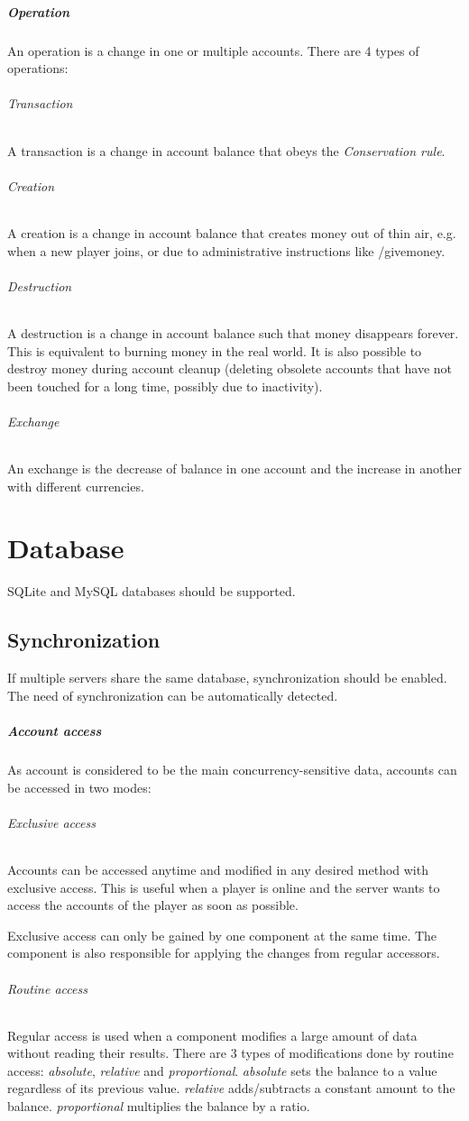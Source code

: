 \documentclass{report}
\begin{document}
			\paragraph{Operation}
				An operation is a change in one or multiple accounts. There are 4 types of operations:
				\subparagraph{Transaction} A transaction is a change in account balance that obeys the \textit{Conservation rule}.
				\subparagraph{Creation} A creation is a change in account balance that creates money out of thin air, e.g. when a new player joins, or due to administrative instructions like /givemoney.
				\subparagraph{Destruction} A destruction is a change in account balance such that money disappears forever. This is equivalent to burning money in the real world. It is also possible to destroy money during account cleanup (deleting obsolete accounts that have not been touched for a long time, possibly due to inactivity).
				\subparagraph{Exchange} An exchange is the decrease of balance in one account and the increase in another with different currencies.

		\chapter{Database}
			SQLite and MySQL databases should be supported.

			\section{Synchronization}
				If multiple servers share the same database, synchronization should be enabled. The need of synchronization can be automatically detected.

				\paragraph{Account access} As account is considered to be the main concurrency-sensitive data, accounts can be accessed in two modes:
					\subparagraph{Exclusive access} Accounts can be accessed anytime and modified in any desired method with exclusive access. This is useful when a player is online and the server wants to access the accounts of the player as soon as possible.

					Exclusive access can only be gained by one component at the same time. The component is also responsible for applying the changes from regular accessors.

					\subparagraph{Routine access} Regular access is used when a component modifies a large amount of data without reading their results. There are 3 types of modifications done by routine access: \emph{absolute}, \emph{relative} and \emph{proportional}. \emph{absolute} sets the balance to a value regardless of its previous value. \emph{relative} adds/subtracts a constant amount to the balance. \emph{proportional} multiplies the balance by a ratio.
\end{document}
